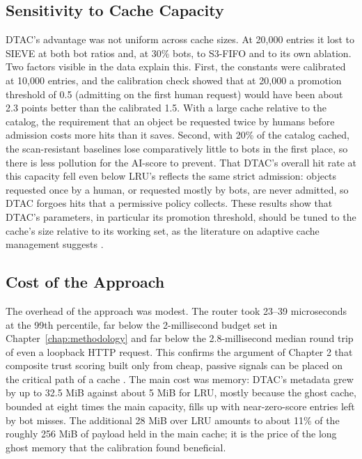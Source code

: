 \subsection{Sensitivity to Cache Capacity}
DTAC's advantage was not uniform across cache sizes. At 20{,}000 entries it lost to SIEVE at both bot ratios and, at 30\% bots, to S3-FIFO and to its own ablation. Two factors visible in the data explain this. First, the constants were calibrated at 10{,}000 entries, and the calibration check showed that at 20{,}000 a promotion threshold of 0.5 (admitting on the first human request) would have been about 2.3 points better than the calibrated 1.5. With a large cache relative to the catalog, the requirement that an object be requested twice by humans before admission costs more hits than it saves. Second, with 20\% of the catalog cached, the scan-resistant baselines lose comparatively little to bots in the first place, so there is less pollution for the AI-score to prevent. That DTAC's overall hit rate at this capacity fell even below LRU's reflects the same strict admission: objects requested once by a human, or requested mostly by bots, are never admitted, so DTAC forgoes hits that a permissive policy collects. These results show that DTAC's parameters, in particular its promotion threshold, should be tuned to the cache's size relative to its working set, as the literature on adaptive cache management suggests \cite{vysotska_towards_2025}.

\subsection{Cost of the Approach}
The overhead of the approach was modest. The router took 23--39 microseconds at the 99th percentile, far below the 2-millisecond budget set in Chapter~\ref{chap:methodology} and far below the 2.8-millisecond median round trip of even a loopback HTTP request. This confirms the argument of Chapter 2 that composite trust scoring built only from cheap, passive signals can be placed on the critical path of a cache \cite{chandra_composite_2026}. The main cost was memory: DTAC's metadata grew by up to 32.5 MiB against about 5 MiB for LRU, mostly because the ghost cache, bounded at eight times the main capacity, fills up with near-zero-score entries left by bot misses. The additional 28 MiB over LRU amounts to about 11\% of the roughly 256 MiB of payload held in the main cache; it is the price of the long ghost memory that the calibration found beneficial.

